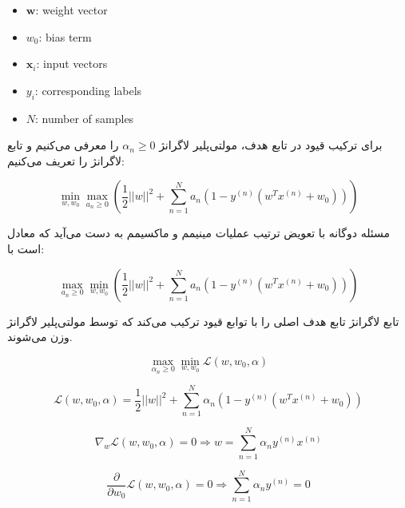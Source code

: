 \documentclass[12pt]{article}
\begin{document}
\begin{latin}
    \begin{itemize}
        \item $\mathbf{w}$: weight vector
        \item $w_0$: bias term
        \item $\mathbf{x}_i$: input vectors
        \item $y_i$: corresponding labels
        \item $N$: number of samples
    \end{itemize}
\end{latin}

برای ترکیب قیود  در تابع هدف، مولتی‌پلیر لاگرانژ $\alpha_n \geq 0$ را معرفی می‌کنیم و تابع لاگرانژ را تعریف می‌کنیم:

\begin{equation}
    \min_{w,w_0} \max_{a_n \geq 0} \left( \frac{1}{2} ||w||^2 + \sum_{n=1}^{N} a_n (1 - y^{(n)} (w^T x^{(n)} + w_0)) \right)
\end{equation}

مسئله دوگانه با تعویض ترتیب عملیات مینیمم و ماکسیمم به دست می‌آید که معادل است با:

\begin{equation}
    \max_{a_n \geq 0} \min_{w,w_0} \left( \frac{1}{2} ||w||^2 + \sum_{n=1}^{N} a_n (1 - y^{(n)} (w^T x^{(n)} + w_0)) \right)
\end{equation}

تابع لاگرانژ تابع هدف اصلی را با توابع قیود ترکیب می‌کند که توسط مولتی‌پلیر لاگرانژ وزن می‌شوند.

\begin{equation}
    \max_{\alpha_n \geq 0} \min_{w,w_0} \mathcal{L}(w, w_0, \alpha)
\end{equation}

\begin{equation}
    \mathcal{L}(w, w_0, \alpha) = \frac{1}{2} ||w||^2 + \sum_{n=1}^{N} \alpha_n (1 - y^{(n)} (w^T x^{(n)} + w_0))
\end{equation}

\begin{equation}
    \nabla_w \mathcal{L}(w, w_0, \alpha) = 0 \Rightarrow w = \sum_{n=1}^{N} \alpha_n y^{(n)} x^{(n)}
\end{equation}

\begin{equation}
    \frac{\partial}{\partial w_0} \mathcal{L}(w, w_0, \alpha) = 0 \Rightarrow \sum_{n=1}^{N} \alpha_n y^{(n)} = 0
\end{equation}
\end{document}
